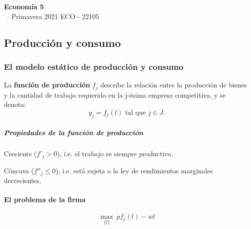\documentclass[8pt,a4paper]{extarticle}
\renewcommand{\csClass}{Economía 5}
\renewcommand{\csClassCode}{ECO - 22105}
\renewcommand{\csTerm}{Primavera 2021}
\begin{document}
\begin{titlepage}
    \begin{center}
	\vspace*{1cm}
	\Huge
        \textbf{\csClass}
	\vspace{0.5cm} \\
	\Large
        \cs\ $\cdot$ \csTerm
        \vfill
        \csAuthorName
	\vspace{0.8cm}
        \csClassCode\\
        \csSchool     
    \end{center}
\end{titlepage}

\begin{multicols}{3}
\setcounter{page}{1}

\part{Producción y consumo}

\section{El modelo estático de producción y consumo}

\begin{boxdef}
	La \textbf{función de producción} $f_j$ describe la relación entre la producción de bienes y la cantidad de trabajo requerido en la j-ésima empresa competitiva, y se denota:
	\[
		y_j = f_j(l) \text{ tal que } j \in J
	.\]
\end{boxdef}

\subsubsection*{Propiedades de la función de producción}

\begin{eqlist}
\item Creciente ($f'_j > 0$), i.e. el trabajo es siempre productivo.
\item Cóncava ($f''_j \le 0$), i.e. está sujeta a la ley de rendimientos marginales decrecientes.
\end{eqlist}

\subsection{El problema de la firma}

\begin{equation*}
	\max_{\{l\}}\ pf_j (l) - wl
\end{equation*}


\end{multicols}
\end{document}
